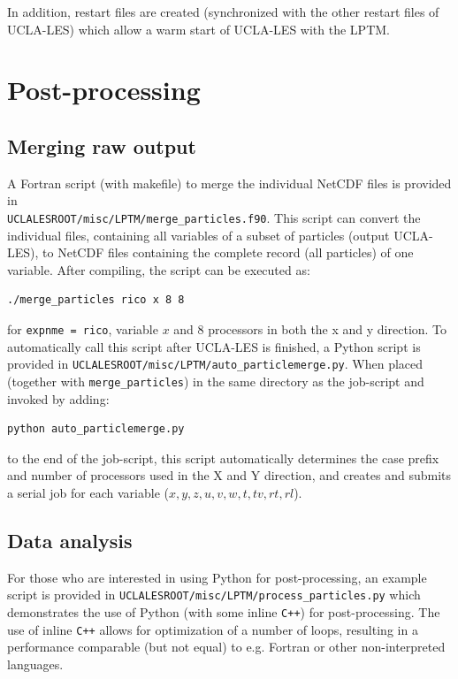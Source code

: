 \documentclass[twoside,a4paper]{report}
\begin{document}
In addition, restart files are created (synchronized with the other restart files of UCLA-LES) which allow a warm start of UCLA-LES with the LPTM.

\section{Post-processing}
\label{sec:postp}

\subsection{Merging raw output}

A Fortran script (with makefile) to merge the individual NetCDF files is provided in\\ \texttt{UCLALESROOT/misc/LPTM/merge\_particles.f90}. This script can convert the individual files, containing all variables of a subset of particles (output UCLA-LES), to NetCDF files containing the complete record (all particles) of one variable. After compiling, the script can be executed as:

\begin{verbatim}
./merge_particles rico x 8 8
\end{verbatim}

for \texttt{expnme = rico}, variable $x$ and 8 processors in both the x and y direction. To automatically call this script after UCLA-LES is finished, a Python script is provided in \texttt{UCLALESROOT/misc/LPTM/auto\_particlemerge.py}. When placed (together with \texttt{merge\_particles}) in the same directory as the job-script and invoked by adding:

\begin{verbatim}
python auto_particlemerge.py
\end{verbatim}

to the end of the job-script, this script automatically determines the case prefix and number of processors used in the X and Y direction, and creates and submits a serial job for each variable ($x,y,z,u,v,w,t,tv,rt,rl$).

\subsection{Data analysis}

For those who are interested in using Python for post-processing, an example script is provided in \texttt{UCLALESROOT/misc/LPTM/process\_particles.py} which demonstrates  the use of Python (with some inline \texttt{C++}) for post-processing. The use of inline \texttt{C++} allows for optimization of a number of loops, resulting in a performance comparable (but not equal) to e.g. Fortran or other non-interpreted languages. 
\end{document}
